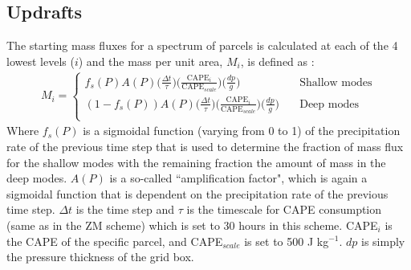 \documentclass[letterpaper,12pt,titlepage,oneside,final]{book}
\begin{document}
\subsection{Updrafts}
The starting mass fluxes for a spectrum of parcels is calculated at each of the 4 lowest levels ($i$) and the mass per unit area, $M_{i}$, is defined as \citep{folkins_simple_2014}:
\begin{align}\label{eq:zmm}
M_{i} = 
     \begin{cases}
       f_{s}(P)A(P)\big(\frac{\Delta{t}}{\tau}\big)\big(\frac{\text{CAPE}_{i}}{\text{CAPE}_{scale}}\big)\big(\frac{dp}{g}\big) &\quad\text{Shallow modes}\\
      (1-f_{s}(P))A(P)\big(\frac{\Delta{t}}{\tau}\big)\big(\frac{\text{CAPE}_{i}}{\text{CAPE}_{scale}}\big)\big(\frac{dp}{g}\big) &\quad\text{Deep modes}\\
     \end{cases}
\end{align}
Where $f_{s}(P)$ is a sigmoidal function (varying from 0 to 1) of the precipitation rate of the previous time step that is used to determine the fraction of mass flux for the shallow modes with the remaining fraction the amount of mass in the deep modes. $A(P)$ is a so-called ``amplification factor", which is again a sigmoidal function that is dependent on the precipitation rate of the previous time step. $\Delta{t}$ is the time step and $\tau$ is the timescale for CAPE consumption (same as in the ZM scheme) which is set to 30 hours in this scheme. CAPE$_{i}$ is the CAPE of the specific parcel, and CAPE$_{scale}$ is set to 500 J kg$^{-1}$. $dp$ is simply the pressure thickness of the grid box.
\end{document}
